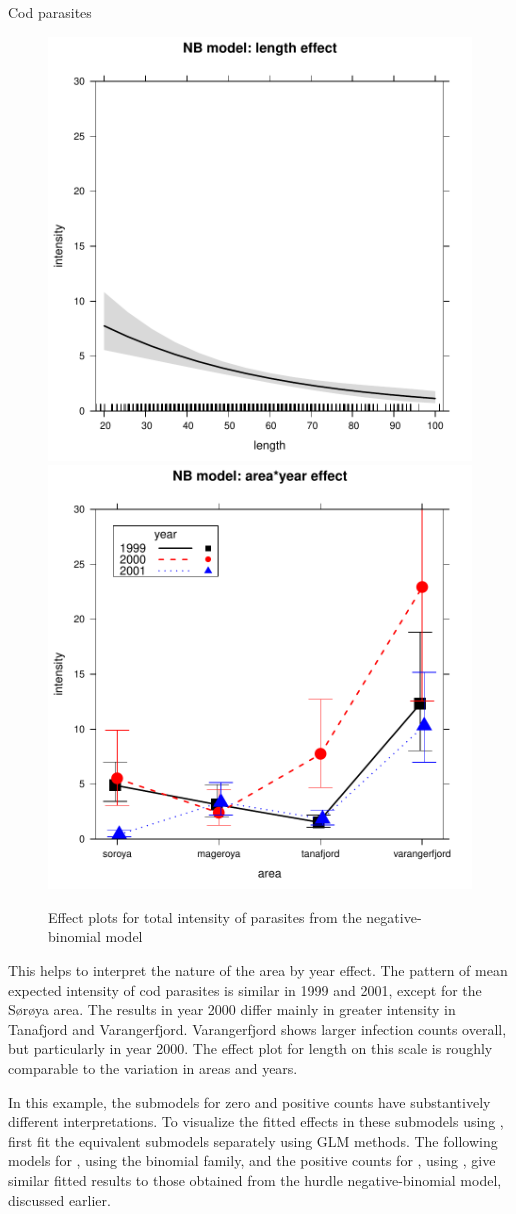 \documentclass[11pt]{book}\usepackage[]{graphicx}\usepackage[]{color}
\newenvironment{knitrout}{}{} %
\renewenvironment{knitrout}{\small\renewcommand{\baselinestretch}{.85}}{} %
\begin{document}
\begin{Example}[cod3]{Cod parasites}
\begin{knitrout}
\begin{figure}[!htbp]
\centerline{\includegraphics[width=.49\textwidth]{ch09/fig/cod3-eff1-1} 
\includegraphics[width=.49\textwidth]{ch09/fig/cod3-eff1-2} }

\caption[Effect plots for total intensity of parasites from the negative-binomial model]{Effect plots for total intensity of parasites from the negative-binomial model\label{fig:cod3-eff1}}
\end{figure}


\end{knitrout}
This helps to interpret the nature of the area by year effect.  The pattern of mean expected
intensity of cod parasites is similar in 1999 and 2001, except for the S{\o}r{\o}ya area.
The results in year 2000 differ mainly in greater intensity in Tanafjord and Varangerfjord.
Varangerfjord shows larger infection counts overall, but particularly in year 2000.
The effect plot for length on this scale is roughly comparable to the variation in
areas and years.

In this example, the submodels for zero and positive counts have substantively different
interpretations. To visualize the fitted effects in these submodels using ,
first fit the equivalent submodels separately using GLM methods. The following
models for , using the binomial family,
and the positive counts for , using ,
give similar fitted
results to those obtained from the hurdle negative-binomial model, 
discussed earlier.


\end{Example}
\end{document}
